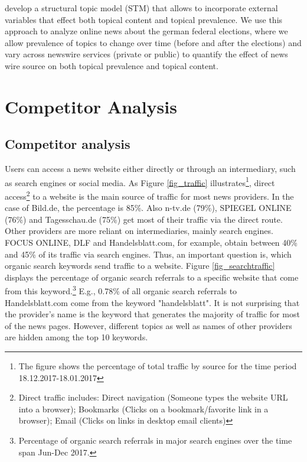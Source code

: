 \documentclass[12pt,a4paper,notitlepage]{article}
\begin{document}
\citet{roberts_model_2016} develop a structural topic model (STM) that allows to incorporate external variables that effect both topical content and topical prevalence. We use this approach to analyze online news about the german federal elections, where we allow prevalence of topics to change over time (before and after the elections) and vary across newswire services (private or public) to quantify the effect of news wire source on both topical prevalence and topical content.

\section{Competitor Analysis}
\subsection{Competitor analysis}



Users can access a news website either directly or through an intermediary, such as search engines or social media.  As Figure \ref{fig_traffic} illustrates\footnote{The figure shows the percentage of total traffic by source for the time period 18.12.2017-18.01.2017}, direct access\footnote{Direct traffic includes: Direct navigation (Someone types the website URL into a browser); Bookmarks (Clicks on a bookmark/favorite link in a browser); Email (Clicks on links in desktop email clients)} to a website is the main source of traffic for most news providers. In the case of Bild.de, the percentage is 85\%. Also n-tv.de (79\%), SPIEGEL ONLINE (76\%) and Tagesschau.de (75\%) get most of their traffic via the direct route. Other providers are more reliant on intermediaries, mainly search engines. FOCUS ONLINE, DLF and Handelsblatt.com, for example, obtain between 40\% and 45\% of its traffic via search engines. Thus, an important question is, which organic search keywords send traffic to a website. Figure \ref{fig_searchtraffic} displays the percentage of organic search referrals to a specific website that come from this keyword.\footnote{Percentage of organic search referrals in major search engines over the time span Jun-Dec 2017.} E.g., 0.78\% of all organic search referrals to Handelsblatt.com come from the keyword "handelsblatt". It is not surprising that the provider's name is the keyword that generates the majority of traffic for most of the news pages. However, different topics as well as names of other providers are hidden among the top 10 keywords.   
\end{document}
